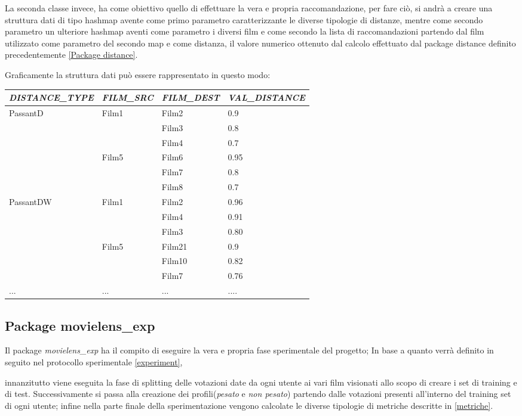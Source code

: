 La seconda classe invece, ha come obiettivo quello di effettuare la vera e propria raccomandazione, per fare ciò, si andrà a creare una struttura dati di tipo hashmap avente come primo parametro caratterizzante le diverse tipologie di distanze, mentre come secondo parametro un ulteriore hashmap aventi come parametro i diversi film e come secondo la lista di raccomandazioni partendo dal film utilizzato come parametro del secondo map e come distanza, il valore numerico ottenuto dal calcolo effettuato dal package distance definito precedentemente \ref{Package distance}. 

Graficamente la struttura dati può essere rappresentato in questo modo:

\begin{table}[H]
	\begin{tabular}{l | l | l | l }
	\emph{DISTANCE\_TYPE} & \emph{FILM\_SRC} & \emph{FILM\_DEST} & \emph{VAL\_DISTANCE} \\
	\toprule
		\multirow{6}{*}{PassantD} & \multirow{3}{*}{Film1} & Film2 & 0.9 \\
		&  & Film3 & 0.8 \\
		&  & Film4 & 0.7 \\ \cline{2-4}
		& \multirow{2}{*}{Film5} & Film6 & 0.95 \\ 
		& & Film7 & 0.8 \\
		& & Film8 & 0.7 \\ \bottomrule
		\multirow{6}{*}{PassantDW} & \multirow{3}{*}{Film1} & Film2 & 0.96 \\
		&  & Film4 & 0.91 \\ 
		&  & Film3 & 0.80 \\ \cline{2-4}
		& \multirow{2}{*}{Film5} & Film21 & 0.9 \\ 
		& & Film10 & 0.82 \\
		& & Film7 & 0.76 \\ \bottomrule
		... & ... & ... & ....
	\end{tabular}
\end{table}


\subsection{Package movielens\_exp}
Il package \emph{movielens\_exp} ha il compito di eseguire la vera e propria fase sperimentale del progetto; In base a quanto verrà definito in seguito nel protocollo sperimentale \ref{experiment},



innanzitutto viene eseguita la fase di splitting delle votazioni date da ogni utente ai vari film visionati allo scopo di creare i set di training e di test. Successivamente si passa alla creazione dei profili(\emph{pesato} e \emph{non pesato}) partendo dalle votazioni presenti all'interno del training set di ogni utente; infine nella parte finale della sperimentazione vengono calcolate le diverse tipologie di metriche descritte in \ref{metriche}.

